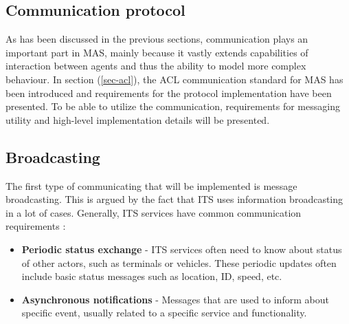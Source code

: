 \documentclass[main.tex]{subfiles}
\begin{document}
\clearpage

\subsection{Communication protocol}

As has been discussed in the previous sections, communication plays an important part in 
MAS, mainly because it vastly extends capabilities of interaction between agents and thus 
the ability to model more complex behaviour. In section (\ref{sec-acl}), the ACL communication 
standard for MAS has been introduced and requirements for the protocol implementation have 
been presented. To be able to 
utilize the communication, requirements for messaging utility and high-level implementation 
details will be presented. 

\subsection{Broadcasting}

The first type of communicating that will be implemented is message broadcasting. This is 
argued by the fact that ITS uses information broadcasting in a lot of cases.
Generally, ITS services have common communication requirements \cite{Santa2013}:

\begin{itemize}
    \item \textbf{Periodic status exchange} - ITS services often need to know about 
    status of other actors, such as terminals or vehicles. These periodic updates 
    often include basic status messages such as location, ID, speed, etc.
    \item \textbf{Asynchronous notifications} - Messages that are used to inform 
    about specific event, usually related to a specific service and functionality.
\end{itemize}


\end{document}
